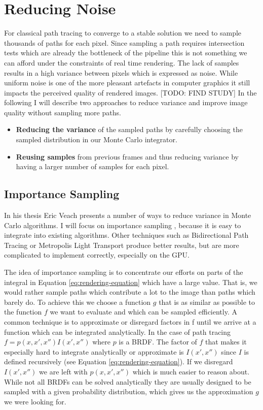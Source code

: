 \documentclass{ACGSeminar}
\begin{document}
\section{Reducing Noise} \label{noise}
For classical path tracing to converge to a stable solution we need to sample thousands of paths for each pixel. Since sampling a path requires intersection tests which are already the bottleneck of the pipeline this is not something we can afford under the constraints of real time rendering. The lack of samples results in a high variance between pixels which is expressed as noise. While uniform noise is one of the more pleasant artefacts in computer graphics it still impacts the perceived quality of rendered images. [TODO: FIND STUDY]
In the following I will describe two approaches to reduce variance and improve image quality without sampling more paths.
\begin{itemize}
\item \textbf{Reducing the variance} of the sampled paths by carefully choosing the sampled distribution in our Monte Carlo integrator.
\item \textbf{Reusing samples} from previous frames and thus reducing variance by having a larger number of samples for each pixel.
\end{itemize}

\subsection{Importance Sampling}
In his thesis Eric Veach presents a number of ways to reduce variance in Monte Carlo algorithms. \cite[45--70]{veach1997robust} I will focus on importance sampling \cite[47--48]{veach1997robust}, because it is easy to integrate into existing algorithms. Other techniques such as Bidirectional Path Tracing or Metropolis Light Transport produce better results, but are more complicated to implement correctly, especially on the GPU.

The idea of importance sampling is to concentrate our efforts on parts of the integral in Equation \eqref{eq:rendering-equation} which have a large value. That is, we would rather sample paths which contribute a lot to the image than paths which barely do. To achieve this we choose a function $g$ that is as similar as possible to the function $f$ we want to evaluate and which can be sampled efficiently. A common technique is to approximate or disregard factors in f until we arrive at a function which can be integrated analytically. In the case of path tracing $f = p(x,x',x'')I(x',x'')$ where $p$ is a BRDF. The factor of $f$ that makes it especially hard to integrate analytically or approximate is $I(x',x'')$ since $I$ is defined recursively (see Equation \eqref{eq:rendering-equation}). If we disregard $I(x',x'')$ we are left with $p(x,x',x'')$ which is much easier to reason about. While not all BRDFs can be solved analytically \cite{Montes2012} they are usually designed to be sampled with a given probability distribution, which gives us the approximation $g$ we were looking for. 
\end{document}
